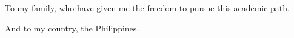 
To my family, who have given me the freedom to pursue this academic path.

And to my country, the Philippines. 